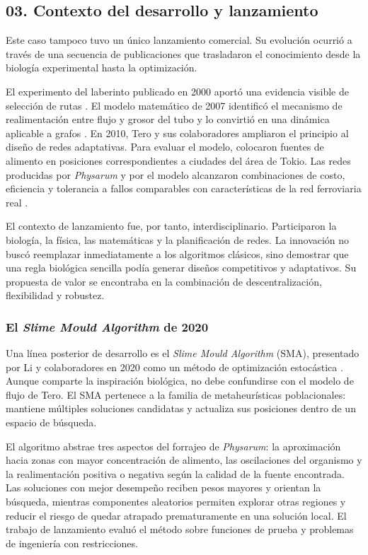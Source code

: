 \documentclass[11pt,letterpaper]{article}
\begin{document}
\subsection*{03. Contexto del desarrollo y lanzamiento}

Este caso tampoco tuvo un único lanzamiento comercial. Su evolución ocurrió a
través de una secuencia de publicaciones que trasladaron el conocimiento desde
la biología experimental hasta la optimización.

El experimento del laberinto publicado en 2000 aportó una evidencia visible de
selección de rutas \parencite{nakagaki2000}. El modelo matemático de 2007
identificó el mecanismo de realimentación entre flujo y grosor del tubo y lo
convirtió en una dinámica aplicable a grafos \parencite{tero2007}. En 2010,
Tero y sus colaboradores ampliaron el principio al diseño de redes adaptativas.
Para evaluar el modelo, colocaron fuentes de alimento en posiciones
correspondientes a ciudades del área de Tokio. Las redes producidas por
\emph{Physarum} y por el modelo alcanzaron combinaciones de costo, eficiencia y
tolerancia a fallos comparables con características de la red ferroviaria real
\parencite{tero2010}.

El contexto de lanzamiento fue, por tanto, interdisciplinario. Participaron la
biología, la física, las matemáticas y la planificación de redes. La innovación
no buscó reemplazar inmediatamente a los algoritmos clásicos, sino demostrar
que una regla biológica sencilla podía generar diseños competitivos y
adaptativos. Su propuesta de valor se encontraba en la combinación de
descentralización, flexibilidad y robustez.

\subsubsection*{El \emph{Slime Mould Algorithm} de 2020}

Una línea posterior de desarrollo es el \emph{Slime Mould Algorithm} (SMA),
presentado por Li y colaboradores en 2020 como un método de optimización
estocástica \parencite{li2020}. Aunque comparte la inspiración biológica, no
debe confundirse con el modelo de flujo de Tero. El SMA pertenece a la familia
de metaheurísticas poblacionales: mantiene múltiples soluciones candidatas y
actualiza sus posiciones dentro de un espacio de búsqueda.

El algoritmo abstrae tres aspectos del forrajeo de \emph{Physarum}: la
aproximación hacia zonas con mayor concentración de alimento, las oscilaciones
del organismo y la realimentación positiva o negativa según la calidad de la
fuente encontrada. Las soluciones con mejor desempeño reciben pesos mayores y
orientan la búsqueda, mientras componentes aleatorios permiten explorar otras
regiones y reducir el riesgo de quedar atrapado prematuramente en una solución
local. El trabajo de lanzamiento evaluó el método sobre funciones de prueba y
problemas de ingeniería con restricciones.
\end{document}
